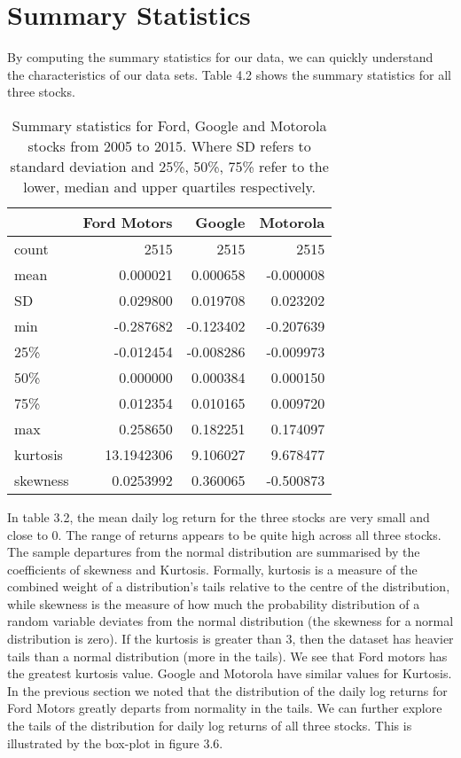 \section{Summary Statistics}

By computing the summary statistics for our data, we can quickly understand the characteristics of our data sets. Table 4.2 shows the summary statistics for all three stocks.

\begin{table}[h]
\centering
\begin{tabular}{lrrr}
\toprule
{} &  Ford Motors &       Google &     Motorola \\
\midrule
count &  2515 &  2515 &  2515 \\
mean  &     0.000021 &     0.000658 &    -0.000008 \\
SD   &     0.029800 &     0.019708 &     0.023202 \\
min   &    -0.287682 &    -0.123402 &    -0.207639 \\
25\%   &    -0.012454 &    -0.008286 &    -0.009973 \\
50\%   &     0.000000 &     0.000384 &     0.000150 \\
75\%   &     0.012354 &     0.010165 &     0.009720 \\
max   &     0.258650 &     0.182251 &     0.174097 \\
kurtosis   &     13.1942306 &     9.106027 &     9.678477 \\
skewness   &     0.0253992 &     0.360065 &     -0.500873 \\
\bottomrule
\end{tabular}
\caption{Summary statistics for Ford, Google and Motorola stocks from 2005 to 2015. Where SD refers to standard deviation and 25\%, 50\%, 75\% refer to the lower, median and upper quartiles respectively.}
\end{table}

In table 3.2, the mean daily log return for the three stocks are very small and close to 0. The range of returns appears to be quite high across all three stocks. The sample departures from the normal distribution are summarised by the coefficients of skewness and Kurtosis. Formally, kurtosis is a measure of the combined weight of a distribution's tails relative to the centre of the distribution, while skewness is the measure of how much the probability distribution of a random variable deviates from the normal distribution (the skewness for a normal distribution is zero). If the kurtosis is greater than 3, then the dataset has heavier tails than a normal distribution (more in the tails). We see that Ford motors has the greatest kurtosis value. Google and Motorola have similar values for Kurtosis.  In the previous section we noted that the distribution of the daily log returns for Ford Motors greatly departs from normality in the tails. We can further explore the tails of the distribution for daily log returns of all three stocks. This is illustrated by the box-plot in figure 3.6.

